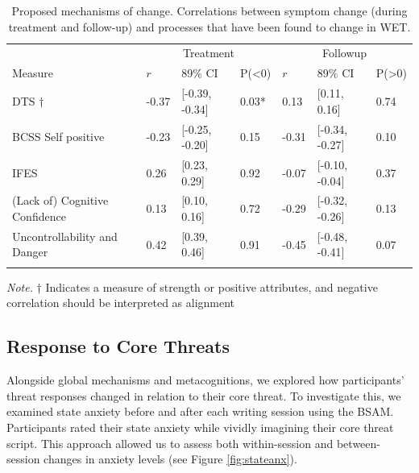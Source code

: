\documentclass[
  man,floatsintext]{apa7}
\begin{document}
\begin{table}[tbp]

\begin{center}
\begin{threeparttable}

\caption{\label{tab:mechanisms.table}Proposed mechanisms of change. Correlations between symptom change (during treatment and follow-up) and processes that have been found to change in WET.}

\begin{tabular}{lllllll}
\toprule
 & \multicolumn{3}{c}{Treatment} & \multicolumn{3}{c}{Followup} \\
\cmidrule(r){2-4} \cmidrule(r){5-7}
Measure & $r$ & 89\% CI & P(<0) & $r$ & 89\% CI & P(>0)\\
\midrule
DTS † & -0.37 & {}[-0.39, -0.34] & 0.03* & 0.13 & {}[0.11, 0.16] & 0.74\\
BCSS Self positive & -0.23 & {}[-0.25, -0.20] & 0.15 & -0.31 & {}[-0.34, -0.27] & 0.10\\
IFES & 0.26 & {}[0.23, 0.29] & 0.92 & -0.07 & {}[-0.10, -0.04] & 0.37\\
(Lack of) Cognitive Confidence & 0.13 & {}[0.10, 0.16] & 0.72 & -0.29 & {}[-0.32, -0.26] & 0.13\\
Uncontrollability and Danger & 0.42 & {}[0.39, 0.46] & 0.91 & -0.45 & {}[-0.48, -0.41] & 0.07\\
\bottomrule
\addlinespace
\end{tabular}

\begin{tablenotes}[para]
\normalsize{\textit{Note.}  † Indicates a measure of strength or positive attributes, and negative correlation should be interpreted as alignment}
\end{tablenotes}

\end{threeparttable}
\end{center}

\end{table}

\subsection{Response to Core Threats}\label{response-to-core-threats}

Alongside global mechanisms and metacognitions, we explored how participants' threat responses changed in relation to their core threat.
To investigate this, we examined state anxiety before and after each writing session using the BSAM.
Participants rated their state anxiety while vividly imagining their core threat script.
This approach allowed us to assess both within-session and between-session changes in anxiety levels (see Figure \ref{fig:stateanx}).
\end{document}
